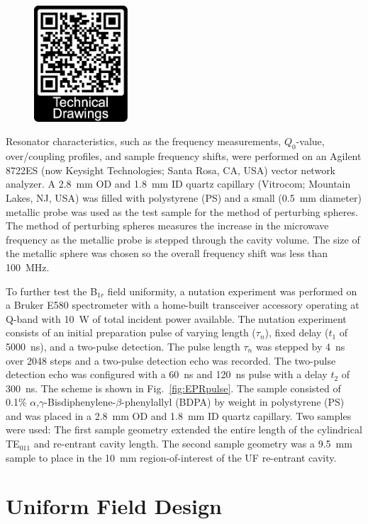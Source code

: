\begin{figure}
\centering
\includegraphics[width=3.5cm]{Kapitel/Appendix/ActEPRdataQR.eps}
\end{figure}

Resonator characteristics, such as the frequency measurements, $Q_0$-value, over\-/coupling profiles, and sample frequency shifts, were performed on an Agilent 8722ES (now Keysight Technologies; Santa Rosa, CA, USA) vector network analyzer. A 2.8~mm OD and 1.8~mm ID quartz capillary (Vitrocom; Mountain Lakes, NJ, USA) was filled with polystyrene (PS) and a small (0.5~mm diameter) metallic probe was used as the test sample for the method of perturbing spheres. The method of perturbing spheres measures the increase in the microwave frequency as the metallic probe is stepped through the cavity volume. The size of the metallic sphere was chosen so the overall frequency shift was less than 100~MHz.

To further test the B$_{1r}$ field uniformity, a nutation experiment was performed on a Bruker E580 spectrometer with a home-built transceiver accessory operating at Q-band with 10~W of total incident power available. The nutation experiment consists of an initial preparation pulse of varying length ($\tau_n$), fixed delay ($t_1$ of 5000~ns), and a two-pulse detection. The pulse length $\tau_n$ was stepped by 4~ns over 2048 steps and a two-pulse detection echo was recorded. \cite{pulsejeschke} The two-pulse detection echo was configured with a 60~ns and 120~ns pulse with a delay $t_2$ of 300~ns. The scheme is shown in Fig.~\ref{fig:EPRpulse}. The sample consisted of 0.1\% $\alpha$,$\gamma$-Bisdiphenylene-$\beta$-phenylallyl (BDPA) by weight in polystyrene (PS) and was placed in a 2.8~mm OD and 1.8~mm ID  quartz capillary. Two samples were used: The first sample geometry extended the entire length of the cylindrical TE$_{011}$ and re-entrant \cylTE{} cavity length. The second sample geometry was a 9.5~mm sample to place in the 10~mm region-of-interest of the UF re-entrant \cylTE{} cavity.

\section{Uniform Field Design}
